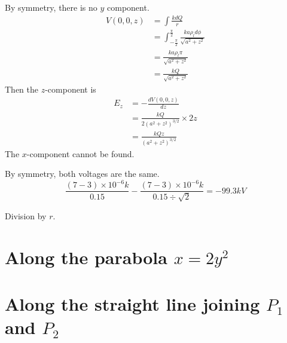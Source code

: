 \documentclass[answers]{exam}
\begin{document}
\begin{questions}
\begin{solution}
	By symmetry, there is no $y$ component.
	\begin{align*}
		V(0,0,z) &= \int \frac{kdQ}{r} \\
			 &= \int_{-\frac{\pi}{2}}^\frac{\pi}{2} \frac{ka\rho_ld\phi}{\sqrt{a^2+z^2}} \\
			 &= \frac{ka\rho_l\pi}{\sqrt{a^2+z^2}} \\
			 &= \frac{kQ}{\sqrt{a^2+z^2}}
	\end{align*}
	Then the $z$-component is
	\begin{align*}
		E_z &= -\frac{dV(0,0,z)}{dz} \\
		    &= \frac{kQ}{2(a^2+z^2)^{3/2}} \times 2z \\
		    &= \frac{kQz}{(a^2+z^2)^{3/2}}
	\end{align*}
	The $x$-component cannot be found.
\end{solution}


\begin{solution}
	By symmetry, both voltages are the same.
	$$\frac{(7-3)\times10^{-6}k}{0.15} - \frac{(7-3)\times10^{-6}k}{0.15\div\sqrt{2}} = -99.3\unit{kV}$$
\end{solution}


\begin{solution}
	Division by $r$.
\end{solution}


\begin{parts}
	\part{Along the parabola $x = 2y^2$}
	\part{Along the straight line joining $P_1$ and $P_2$}
\end{parts}


\end{questions}
\end{document}
